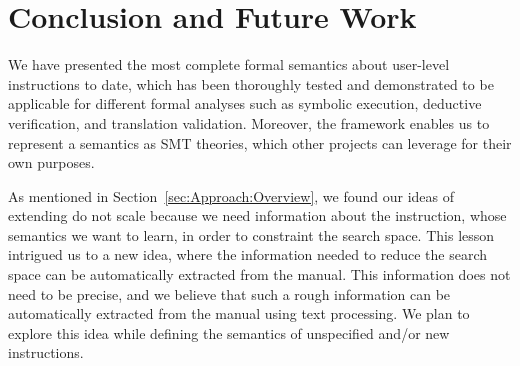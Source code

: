 \section{Conclusion and Future Work}\label{sec:conc}

We have presented the most complete formal semantics about \ISA user-level instructions
to date, which has been thoroughly tested and demonstrated  to be applicable
for different formal analyses such as symbolic execution, deductive
verification, and translation validation.
Moreover, the \K framework enables us to represent a semantics as SMT theories,
which other projects can
leverage for their own purposes.

As mentioned in Section~\ref{sec:Approach:Overview}, we found our ideas of extending \Strata do not scale because we need information about the instruction, whose semantics we want to learn, in order to constraint the search space. This lesson intrigued us to a new idea, where the information needed to reduce the search space can be automatically extracted from the manual. This  information does not need to be precise, and we believe that such a rough information can be automatically extracted from the manual using text processing.  We plan to explore this idea while defining the semantics of unspecified and/or new instructions.
 


   
